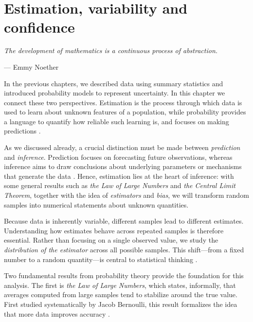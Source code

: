 \chapter{Estimation, variability and confidence}
\label{chapter3}

\epigraph{\textit{The development of mathematics is a continuous process of abstraction.}}{— Emmy Noether}

In the previous chapters, we described data using summary statistics and introduced probability models to represent uncertainty. In this chapter we connect these two perspectives. Estimation is the process through which data is used to learn about unknown features of a population, while probability provides a language to quantify how reliable such learning is, and focuses on making predictions \cite{degroot_2012_probability, bandyopadhyay_2011_philosophy}.

\medskip

As we discussed already, a crucial distinction must be made between \textit{prediction} and \textit{inference}. Prediction focuses on forecasting future observations, whereas inference aims to draw conclusions about underlying parameters or mechanisms that generate the data \cite{diez_2025_openintro}. Hence, estimation lies at the heart of inference: with some general results such as \textit{the Law of Large Numbers} and \textit{the Central Limit Theorem}, together with the idea of \textit{estimators} and \textit{bias}, we will transform random samples into numerical statements about unknown quantities.

\medskip

Because data is inherently variable, different samples lead to different estimates. Understanding how estimates behave across repeated samples is therefore essential. Rather than focusing on a single observed value, we study the \emph{distribution of the estimator} across all possible samples. This shift—from a fixed number to a random quantity—is central to statistical thinking \cite{degroot_2012_probability, bandyopadhyay_2011_philosophy}.

\medskip

Two fundamental results from probability theory provide the foundation for this analysis. The first is \textit{the Law of Large Numbers}, which states, informally, that averages computed from large samples tend to stabilize around the true value. First studied systematically by Jacob Bernoulli, this result formalizes the idea that more data improves accuracy \cite{bernoulli_1713_ars}.

